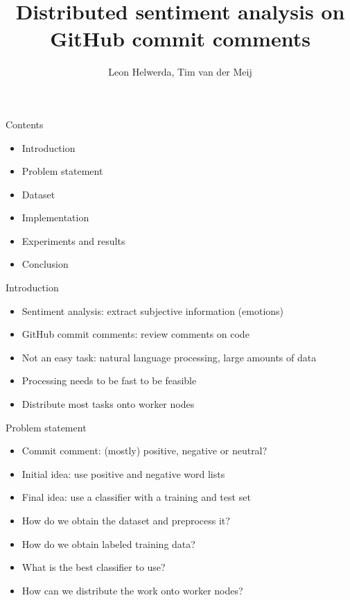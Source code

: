 \documentclass[t,11pt]{beamer}
\title{Distributed sentiment analysis on GitHub commit comments}
\date{\now}
\author{Leon Helwerda, Tim van der Meij}
\begin{document}
{
\begin{frame}[plain]
  \maketitle
\end{frame}
\addtocounter{framenumber}{-1}}

\toggleslidecolors

\begin{frame}[fragile]{Contents}
\begin{itemize}
  \item Introduction
  \item Problem statement
  \item Dataset
  \item Implementation
  \item Experiments and results
  \item Conclusion
\end{itemize}
\end{frame}

\begin{frame}[fragile]{Introduction}
\begin{itemize}
  \item Sentiment analysis: extract subjective information (emotions)
  \item GitHub commit comments: review comments on code
  \item Not an easy task: natural language processing, large amounts of data
  \item Processing needs to be fast to be feasible
  \item Distribute most tasks onto worker nodes
\end{itemize}
\end{frame}

\begin{frame}[fragile]{Problem statement}
\begin{itemize}
  \item Commit comment: (mostly) positive, negative or neutral?
  \item Initial idea: use positive and negative word lists
  \item Final idea: use a classifier with a training and test set
\end{itemize}
\begin{itemize}
  \item How do we obtain the dataset and preprocess it?
  \item How do we obtain labeled training data?
  \item What is the best classifier to use?
  \item How can we distribute the work onto worker nodes?
\end{itemize}
\end{frame}
\end{document}
